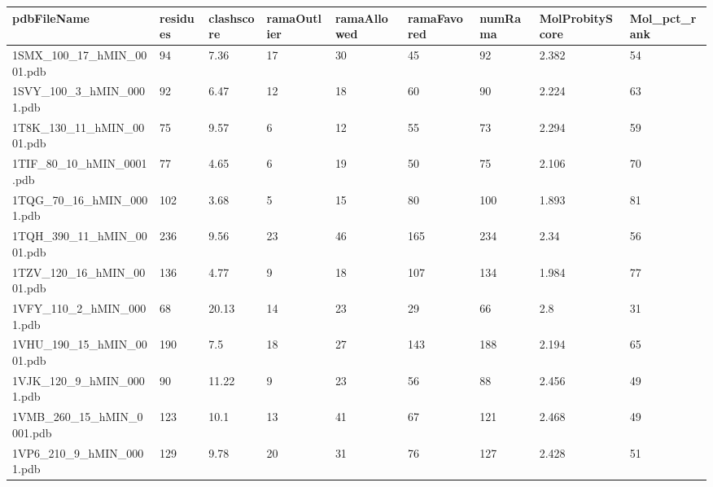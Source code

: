 \documentclass{bioinfo}
\begin{document}
\begin{table*}[!t]
{\begin{tabular}{lllllllll}\toprule
    pdbFileName             & residues & clashscore & ramaOutlier & ramaAllowed & ramaFavored & numRama & MolProbityScore & Mol\_pct\_rank \\ \midrule
    1SMX\_100\_17\_hMIN\_0001.pdb & 94       & 7.36       & 17          & 30          & 45          & 92      & 2.382           & 54           \\
    1SVY\_100\_3\_hMIN\_0001.pdb & 92       & 6.47       & 12          & 18          & 60          & 90      & 2.224           & 63           \\
    1T8K\_130\_11\_hMIN\_0001.pdb & 75       & 9.57       & 6           & 12          & 55          & 73      & 2.294           & 59           \\
    1TIF\_80\_10\_hMIN\_0001.pdb & 77       & 4.65       & 6           & 19          & 50          & 75      & 2.106           & 70           \\
    1TQG\_70\_16\_hMIN\_0001.pdb & 102      & 3.68       & 5           & 15          & 80          & 100     & 1.893           & 81           \\
    1TQH\_390\_11\_hMIN\_0001.pdb & 236      & 9.56       & 23          & 46          & 165         & 234     & 2.34            & 56           \\
    1TZV\_120\_16\_hMIN\_0001.pdb & 136      & 4.77       & 9           & 18          & 107         & 134     & 1.984           & 77           \\
    1VFY\_110\_2\_hMIN\_0001.pdb & 68       & 20.13      & 14          & 23          & 29          & 66      & 2.8             & 31           \\
    1VHU\_190\_15\_hMIN\_0001.pdb & 190      & 7.5        & 18          & 27          & 143         & 188     & 2.194           & 65           \\
    1VJK\_120\_9\_hMIN\_0001.pdb & 90       & 11.22      & 9           & 23          & 56          & 88      & 2.456           & 49           \\
    1VMB\_260\_15\_hMIN\_0001.pdb & 123      & 10.1       & 13          & 41          & 67          & 121     & 2.468           & 49           \\
    1VP6\_210\_9\_hMIN\_0001.pdb & 129      & 9.78       & 20          & 31          & 76          & 127     & 2.428           & 51           \\

\end{tabular}}
\end{table*}
\end{document}
